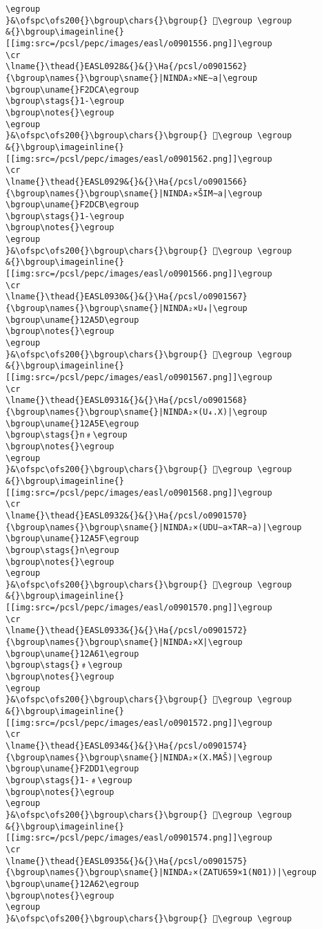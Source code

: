 \begin{verbatim}
\egroup
}&\ofspc\ofs200{}\bgroup\chars{}\bgroup{} 𒩜\egroup \egroup
&{}\bgroup\imageinline{}[[img:src=/pcsl/pepc/images/easl/o0901556.png]]\egroup
\cr
\lname{}\thead{}EASL0928&{}&{}\Ha{/pcsl/o0901562}{\bgroup\names{}\bgroup\sname{}|NINDA₂×NE∼a|\egroup
\bgroup\uname{}F2DCA\egroup
\bgroup\stags{}1-\egroup
\bgroup\notes{}\egroup
\egroup
}&\ofspc\ofs200{}\bgroup\chars{}\bgroup{} 󲷊\egroup \egroup
&{}\bgroup\imageinline{}[[img:src=/pcsl/pepc/images/easl/o0901562.png]]\egroup
\cr
\lname{}\thead{}EASL0929&{}&{}\Ha{/pcsl/o0901566}{\bgroup\names{}\bgroup\sname{}|NINDA₂×ŠIM∼a|\egroup
\bgroup\uname{}F2DCB\egroup
\bgroup\stags{}1-\egroup
\bgroup\notes{}\egroup
\egroup
}&\ofspc\ofs200{}\bgroup\chars{}\bgroup{} 󲷋\egroup \egroup
&{}\bgroup\imageinline{}[[img:src=/pcsl/pepc/images/easl/o0901566.png]]\egroup
\cr
\lname{}\thead{}EASL0930&{}&{}\Ha{/pcsl/o0901567}{\bgroup\names{}\bgroup\sname{}|NINDA₂×U₄|\egroup
\bgroup\uname{}12A5D\egroup
\bgroup\notes{}\egroup
\egroup
}&\ofspc\ofs200{}\bgroup\chars{}\bgroup{} 𒩝\egroup \egroup
&{}\bgroup\imageinline{}[[img:src=/pcsl/pepc/images/easl/o0901567.png]]\egroup
\cr
\lname{}\thead{}EASL0931&{}&{}\Ha{/pcsl/o0901568}{\bgroup\names{}\bgroup\sname{}|NINDA₂×(U₄.X)|\egroup
\bgroup\uname{}12A5E\egroup
\bgroup\stags{}n﹟\egroup
\bgroup\notes{}\egroup
\egroup
}&\ofspc\ofs200{}\bgroup\chars{}\bgroup{} 𒩞\egroup \egroup
&{}\bgroup\imageinline{}[[img:src=/pcsl/pepc/images/easl/o0901568.png]]\egroup
\cr
\lname{}\thead{}EASL0932&{}&{}\Ha{/pcsl/o0901570}{\bgroup\names{}\bgroup\sname{}|NINDA₂×(UDU∼a×TAR∼a)|\egroup
\bgroup\uname{}12A5F\egroup
\bgroup\stags{}n\egroup
\bgroup\notes{}\egroup
\egroup
}&\ofspc\ofs200{}\bgroup\chars{}\bgroup{} 𒩟\egroup \egroup
&{}\bgroup\imageinline{}[[img:src=/pcsl/pepc/images/easl/o0901570.png]]\egroup
\cr
\lname{}\thead{}EASL0933&{}&{}\Ha{/pcsl/o0901572}{\bgroup\names{}\bgroup\sname{}|NINDA₂×X|\egroup
\bgroup\uname{}12A61\egroup
\bgroup\stags{}﹟\egroup
\bgroup\notes{}\egroup
\egroup
}&\ofspc\ofs200{}\bgroup\chars{}\bgroup{} 𒩡\egroup \egroup
&{}\bgroup\imageinline{}[[img:src=/pcsl/pepc/images/easl/o0901572.png]]\egroup
\cr
\lname{}\thead{}EASL0934&{}&{}\Ha{/pcsl/o0901574}{\bgroup\names{}\bgroup\sname{}|NINDA₂×(X.MAŠ)|\egroup
\bgroup\uname{}F2DD1\egroup
\bgroup\stags{}1-﹟\egroup
\bgroup\notes{}\egroup
\egroup
}&\ofspc\ofs200{}\bgroup\chars{}\bgroup{} 󲷑\egroup \egroup
&{}\bgroup\imageinline{}[[img:src=/pcsl/pepc/images/easl/o0901574.png]]\egroup
\cr
\lname{}\thead{}EASL0935&{}&{}\Ha{/pcsl/o0901575}{\bgroup\names{}\bgroup\sname{}|NINDA₂×(ZATU659×1(N01))|\egroup
\bgroup\uname{}12A62\egroup
\bgroup\notes{}\egroup
\egroup
}&\ofspc\ofs200{}\bgroup\chars{}\bgroup{} 𒩢\egroup \egroup

\end{verbatim}
